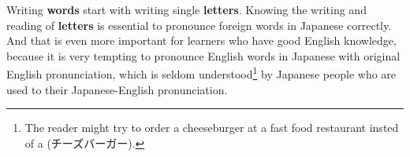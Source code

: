 
Writing \textbf{\jtopic{} words} start with writing single \textbf{\jtopic{}
letters}. Knowing the writing and reading of \textbf{\jtopic{} letters} is
essential to pronounce foreign words in Japanese correctly. And that is even
more important for learners who have good English knowledge, because it is very
tempting to pronounce English words in Japanese with original English
pronunciation, which is seldom understood\footnote{The reader might try to
order a cheeseburger at a fast food restaurant insted of a
 (チーズバーガー).} by Japanese people who are used to
their Japanese-English pronunciation.

